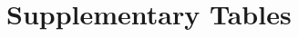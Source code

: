 \documentclass[pdflatex,sn-nature]{sn-jnl}
\def\pandocbounded#1{%
  \begingroup
  \setkeys{Gin}{width=1.0\linewidth,height=1.0\textheight,keepaspectratio}%
  #1%
  \endgroup
}
\begin{document}
%

\clearpage

\section{Supplementary Tables}
\end{document}
